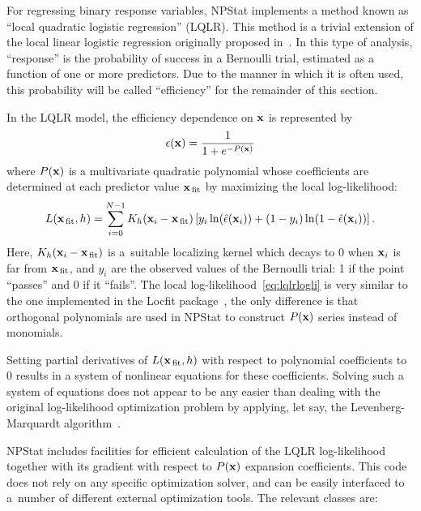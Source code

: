 \documentclass[12pt,titlepage]{article}
\newcommand{\sub}[1]{\ensuremath{_{\mbox{\scriptsize \,#1}}}}
\begin{document}
For regressing binary response variables,
NPStat implements a method known as ``local quadratic logistic regression''
(LQLR). This method is a trivial extension of the local linear
logistic regression originally proposed in~\cite{ref:localreg}.
In this type of analysis, ``response'' is the probability of
success in a Bernoulli trial, estimated as a function of one or more
predictors. Due to the manner in which it is often used, this probability 
will be called ``efficiency'' for the remainder of this section.

In the LQLR model, the efficiency dependence on ${\bf x}$ is represented by
\begin{equation}
\epsilon({\bf x}) = \frac{1}{1 + e^{-P({\bf x})}}
\end{equation}
where $P({\bf x})$ is a multivariate quadratic polynomial whose
coefficients are determined at each predictor value ${\bf x}\sub{fit}$
by maximizing the local log-likelihood:
\begin{equation}
L({\bf x}\sub{fit}, h) = \sum_{i=0}^{N-1} K_h({\bf x}_{i} - {\bf x}\sub{fit}) \left[y_i \ln (\hat{\epsilon}({\bf x}_{i})) + (1 - y_i) \ln (1 - \hat{\epsilon}({\bf x}_{i})) \right].
\label{eq:lqlrlogli}
\end{equation}
Here,
$K_h({\bf x}_{i} - {\bf x}\sub{fit})$ is a~suitable localizing kernel which decays to 0
when ${\bf x}_{i}$ is far from ${\bf x}\sub{fit}$, and $y_i$ are the observed values
of the Bernoulli trial: 1 if the point ``passes'' and 0 if it ``fails''.
The local log-likelihood~\ref{eq:lqlrlogli} is very similar to the one
implemented in the Locfit package~\cite{ref:locfit}, the only difference
is that orthogonal polynomials are used in NPStat to construct
$P({\bf x})$ series instead of monomials.

Setting partial derivatives of $L({\bf x}\sub{fit}, h)$ with respect to
polynomial coefficients to 0 results in a system of nonlinear
equations for these coefficients. Solving such a system of equations
does not appear to be any easier than dealing with the original log-likelihood
optimization problem by applying, let say, the Levenberg-Marquardt
algorithm~\cite{ref:lvm}.

NPStat includes facilities for efficient calculation of the LQLR
log-likelihood together with
its gradient with respect to $P({\bf x})$ expansion coefficients.
This code does not rely on any specific optimization solver,
and can be easily interfaced to a~number of different external
optimization tools. The relevant classes are:
\end{document}
